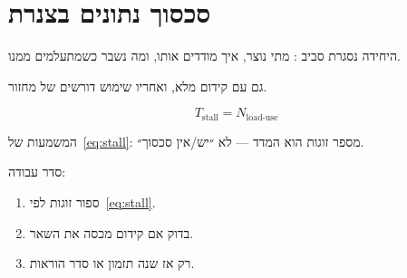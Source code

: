 \chapter{סכסוך נתונים בצנרת}
\label{ch:hazard}

היחידה נסגרת סביב : מתי נוצר, איך מודדים אותו, ומה נשבר כשמתעלמים ממנו.

\begin{warnbox}[frametitle={מלכודת — קידום לא תמיד מספיק}]
גם עם קידום מלא,  ואחריו שימוש דורשים  של מחזור.
\end{warnbox}

\begin{equation}
\label{eq:stall}
T_{\mathrm{stall}}=N_{\mathrm{load\text{-}use}}
\end{equation}

המשמעות של~\eqref{eq:stall}: מספר זוגות  הוא המדד — לא ״יש/אין סכסוך״.

סדר עבודה:
\begin{enumerate}\itemsep3pt
\item[(\textbf{א})] ספור זוגות  לפי~\eqref{eq:stall}.
\item[(\textbf{ב})] בדוק אם קידום מכסה את השאר.
\item[(\textbf{ג})] רק אז שנה תזמון או סדר הוראות.
\end{enumerate}


